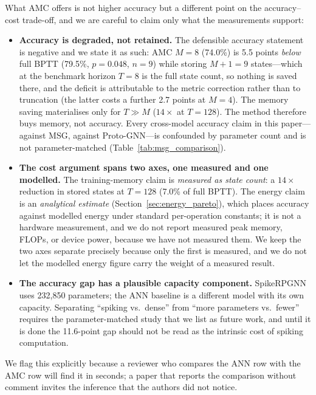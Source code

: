 \documentclass[a4paper,fleqn]{cas-dc}
\begin{document}
What AMC offers is not higher accuracy but a different point on the accuracy--cost trade-off, and we are careful to claim only what the measurements support:

\begin{itemize}
    \item \textbf{Accuracy is degraded, not retained.} The defensible accuracy statement is negative and we state it as such: AMC $M{=}8$ (74.0\%) is 5.5 points \emph{below} full BPTT (79.5\%, $p{=}0.048$, $n{=}9$) while storing $M{+}1{=}9$ states---which at the benchmark horizon $T{=}8$ is the full state count, so nothing is saved there, and the deficit is attributable to the metric correction rather than to truncation (the latter costs a further 2.7 points at $M{=}4$). The memory saving materialises only for $T \gg M$ ($14\times$ at $T{=}128$). The method therefore buys memory, not accuracy. Every cross-model accuracy claim in this paper---against MSG, against Proto-GNN---is confounded by parameter count and is not parameter-matched (Table~\ref{tab:msg_comparison}).
    \item \textbf{The cost argument spans two axes, one measured and one modelled.} The training-memory claim is \emph{measured as state count}: a $14\times$ reduction in stored states at $T{=}128$ (7.0\% of full BPTT). The energy claim is an \emph{analytical estimate} (Section~\ref{sec:energy_pareto}), which places accuracy against modelled energy under standard per-operation constants; it is not a hardware measurement, and we do not report measured peak memory, FLOPs, or device power, because we have not measured them. We keep the two axes separate precisely because only the first is measured, and we do not let the modelled energy figure carry the weight of a measured result.
    \item \textbf{The accuracy gap has a plausible capacity component.} SpikeRPGNN uses 232,850 parameters; the ANN baseline is a different model with its own capacity. Separating ``spiking vs.\ dense'' from ``more parameters vs.\ fewer'' requires the parameter-matched study that we list as future work, and until it is done the 11.6-point gap should not be read as the intrinsic cost of spiking computation.
\end{itemize}

We flag this explicitly because a reviewer who compares the ANN row with the AMC row will find it in seconds; a paper that reports the comparison without comment invites the inference that the authors did not notice.
\end{document}
